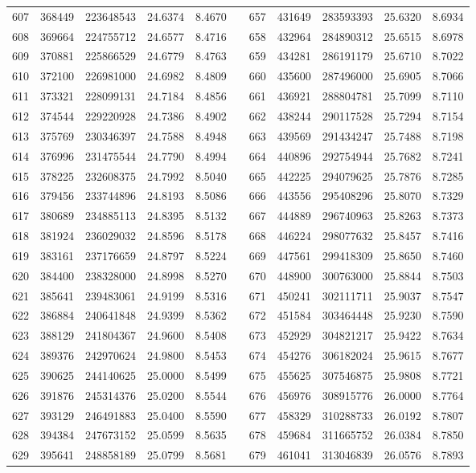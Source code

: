 \begin{longtable}{rrrrrrrrrrr}
607&368449&223648543&24.6374&8.4670&&657&431649&283593393&25.6320&8.6934\\
608&369664&224755712&24.6577&8.4716&&658&432964&284890312&25.6515&8.6978\\
609&370881&225866529&24.6779&8.4763&&659&434281&286191179&25.6710&8.7022\\
610&372100&226981000&24.6982&8.4809&&660&435600&287496000&25.6905&8.7066\\
611&373321&228099131&24.7184&8.4856&&661&436921&288804781&25.7099&8.7110\\
612&374544&229220928&24.7386&8.4902&&662&438244&290117528&25.7294&8.7154\\
613&375769&230346397&24.7588&8.4948&&663&439569&291434247&25.7488&8.7198\\
614&376996&231475544&24.7790&8.4994&&664&440896&292754944&25.7682&8.7241\\
615&378225&232608375&24.7992&8.5040&&665&442225&294079625&25.7876&8.7285\\
616&379456&233744896&24.8193&8.5086&&666&443556&295408296&25.8070&8.7329\\
617&380689&234885113&24.8395&8.5132&&667&444889&296740963&25.8263&8.7373\\
618&381924&236029032&24.8596&8.5178&&668&446224&298077632&25.8457&8.7416\\
619&383161&237176659&24.8797&8.5224&&669&447561&299418309&25.8650&8.7460\\
620&384400&238328000&24.8998&8.5270&&670&448900&300763000&25.8844&8.7503\\
621&385641&239483061&24.9199&8.5316&&671&450241&302111711&25.9037&8.7547\\
622&386884&240641848&24.9399&8.5362&&672&451584&303464448&25.9230&8.7590\\
623&388129&241804367&24.9600&8.5408&&673&452929&304821217&25.9422&8.7634\\
624&389376&242970624&24.9800&8.5453&&674&454276&306182024&25.9615&8.7677\\
625&390625&244140625&25.0000&8.5499&&675&455625&307546875&25.9808&8.7721\\
626&391876&245314376&25.0200&8.5544&&676&456976&308915776&26.0000&8.7764\\
627&393129&246491883&25.0400&8.5590&&677&458329&310288733&26.0192&8.7807\\
628&394384&247673152&25.0599&8.5635&&678&459684&311665752&26.0384&8.7850\\
629&395641&248858189&25.0799&8.5681&&679&461041&313046839&26.0576&8.7893\\

\end{longtable}
